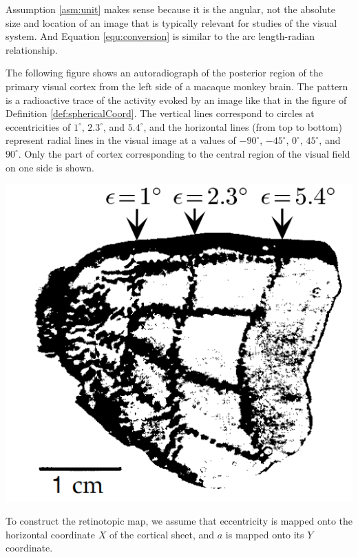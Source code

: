 \begin{rem}
  Assumption \ref{asm:unit} makes sense because it is the angular, not the absolute size and location of an image that is typically relevant for studies of the visual system. And Equation \ref{equ:conversion} is similar to the arc length-radian relationship.
\end{rem}

\begin{exm}
  \label{exm:cortexImage}
  The following figure shows an autoradiograph of the posterior region of the primary visual cortex from the left side of a macaque monkey brain. The pattern is a radioactive trace of the activity evoked by an image like that in the figure of Definition \ref{def:sphericalCoord}. The vertical lines correspond to circles at eccentricities of $1^{\circ}$, $2.3^{\circ}$, and $5.4^{\circ}$, and the horizontal lines (from top to bottom) represent radial lines in the visual image at a values of $-90^{\circ}$, $-45^{\circ}$, $0^{\circ}$, $45^{\circ}$, and $90^{\circ}$. Only the part of cortex corresponding to the central region of the visual field on one side is shown.
  \begin{center}
    \includegraphics[scale=0.2]{./png/exm_cortexImage}
  \end{center}
\end{exm}

\begin{asm}
  \label{mapOnto}
  To construct the retinotopic map, we assume that eccentricity is mapped onto the horizontal coordinate $X$ of the cortical sheet, and $a$ is mapped onto its $Y$ coordinate.
\end{asm}

